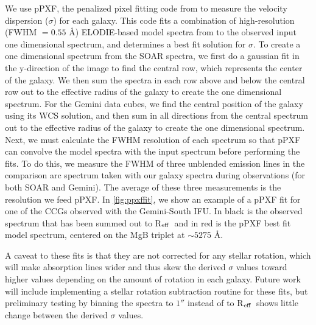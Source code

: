 \documentclass[iop,apj]{emulateapj}
\newcommand{\Reff}{R$_{\rm eff}$}
\begin{document}
  We use {\sc pPXF}, the penalized pixel fitting code from \citet{Cappellari2004} to measure the velocity dispersion ($\sigma$) for each galaxy. This code fits a combination of high-resolution (FWHM $= 0.55$ \AA) ELODIE-based model spectra from \citet{Maraston2011} to the observed input one dimensional spectrum, and determines a best fit solution for $\sigma$. To create a one dimensional spectrum from the SOAR spectra, we first do a gaussian fit in the y-direction of the image to find the central row, which represents the center of the galaxy. We then sum the spectra in each row above and below the central row out to the effective radius of the galaxy to create the one dimensional spectrum. For the Gemini data cubes, we find the central position of the galaxy using its WCS solution, and then sum in all directions from the central spectrum out to the effective radius of the galaxy to create the one dimensional spectrum. Next, we must calculate the FWHM resolution of each spectrum so that {\sc pPXF} can convolve the model spectra with the input spectrum before performing the fits. To do this, we measure the FWHM of three unblended emission lines in the comparison arc spectrum taken with our galaxy spectra during observations (for both SOAR and Gemini). The average of these three measurements is the resolution we feed {\sc pPXF}. In \autoref{fig:ppxffit}, we show an example of a pPXF fit for one of the CCGs observed with the Gemini-South IFU. In black is the observed spectrum that has been summed out to \Reff\ and in red is the pPXF best fit model spectrum, centered on the MgB triplet at $\sim 5275$ \AA.

A caveat to these fits is that they are not corrected for any stellar rotation, which will make absorption lines wider and thus skew the derived $\sigma$ values toward higher values depending on the amount of rotation in each galaxy. Future work will include implementing a stellar rotation subtraction routine for these fits, but preliminary testing by binning the spectra to $1''$ instead of to \Reff\ shows little change between the derived $\sigma$ values. 
\end{document}
